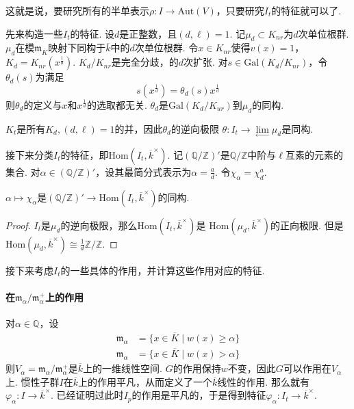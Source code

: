 这就是说，要研究所有的半单表示$\rho: I\to \mathrm{Aut}(V)$，只要研究$I_t$的特征就可以了.

先来构造一些$I_t$的特征. 设$d$是正整数，且$(d,\ell) = 1$.
记$\mu_d \subset K_{nr}$为$d$次单位根群.
$\mu_d$在模$\mathfrak{m}_{\overline{K}}$映射下同构于$\overline{k}$中的$d$次单位根群.
令$x\in K_{nr}$使得$v(x) = 1$，$K_d = K_{nr}(x^{\frac{1}{d}})$.
$K_d/K_{nr}$是完全分歧，\tame 的$d$次扩张.
对$s\in \mathrm{Gal}(K_d/K_{nr})$，令$\theta_d(s)$为满足
\begin{equation}
    s(x^{\frac{1}{d}}) = \theta_d(s) x^{\frac{1}{d}}
\end{equation}
则$\theta_d$的定义与$x$和$x^{\frac{1}{d}}$的选取都无关.
$\theta_d$是$\mathrm{Gal}(K_d/K_{ur})$到$\mu_d$的同构.

$K_{t}$是所有$K_d,(d,\ell)=1$的并，因此$\theta_d$的逆向极限
$\theta: I_t \to \lim\limits_{\longleftarrow} \mu_d$是同构.

接下来分类$I_t$的特征，即$\mathrm{Hom}(I_t, \overline{k}^{\times})$.
记$(\mathbb{Q}/\mathbb{Z})'$是$\mathbb{Q}/\mathbb{Z}$中阶与$\ell$互素的元素的集合.
对$\alpha \in (\mathbb{Q}/\mathbb{Z})'$，设其最简分式表示为$\alpha = \frac{a}{d}$.
令$\chi_{\alpha} = \chi_{d}^{a}$.

\begin{cprop}
    $\alpha\mapsto \chi_{\alpha}$是$(\mathbb{Q}/\mathbb{Z})'\to \mathrm{Hom}(I_t, \overline{k}^{\times})$的同构.
\end{cprop}

\begin{proof}
    $I_t$是$\mu_d$的逆向极限，那么$\mathrm{Hom}(I_t, \overline{k}^{\times})$是
    $\mathrm{Hom}(\mu_d, \overline{k}^{\times})$的正向极限.
    但是$\mathrm{Hom}(\mu_d, \overline{k}^{\times}) \cong \frac{1}{d}\mathbb{Z}/\mathbb{Z}$.
\end{proof}

接下来考虑$I_t$的一些具体的作用，并计算这些作用对应的特征.

\paragraph{在$\mathfrak{m}_{\alpha}/\mathfrak{m}_{\alpha}^{+}$上的作用}
对$\alpha\in \mathbb{Q}$，设
\begin{align}
    \mathfrak{m}_{\alpha} &= \{x\in \overline{K}\mid w(x) \geq \alpha \} \\
    \mathfrak{m}_{\alpha} &= \{x\in \overline{K}\mid w(x) > \alpha \}
\end{align}
则$V_{\alpha} = \mathfrak{m}_{\alpha} / \mathfrak{m}_{\alpha}^{+}$是$\overline{k}$上的一维线性空间.
$G$的作用保持$w$不变，因此$G$可以作用在$V_{\alpha}$上.
惯性子群$I$在$\overline{k}$上的作用平凡，从而定义了一个$\overline{k}$线性的作用.
那么就有$\varphi_{\alpha}: I\to \overline{k}^{\times}$.
已经证明过此时$I_p$的作用是平凡的，于是得到特征$\varphi_{\alpha}: I_t\to \overline{k}^{\times}$.

